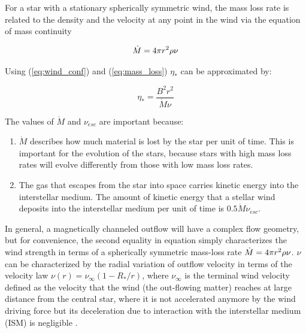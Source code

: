 \documentclass[fleqn,usenatbib]{mnras}
\begin{document}
For a star with a stationary spherically symmetric wind, the mass loss rate is related to the density and the velocity at any point in the wind via the equation of mass continuity

\begin{ceqn}
\begin{equation}
    \Dot{M} = 4\pi r^2\rho\nu \label{eq:mass_loss}
\end{equation}
\end{ceqn}

Using (\ref{eq:wind_conf}) and (\ref{eq:mass_loss}) $\eta_*$ can be approximated by: 
\begin{ceqn}
\begin{equation}
    \eta_* = \frac{B^{2}r^{2}}{\Dot{M}\nu} \label{eq:wind_conf2}
\end{equation}
\end{ceqn}

The values of $\Dot{M}$ and $\nu_{esc}$ are important because:
 \begin{enumerate}
    \item $\Dot{M}$ describes how much material is lost by the star per unit of time. This is important for the evolution of the stars, because stars with high mass loss rates will evolve differently from those with low mass loss rates.
    \item The gas that escapes from the star into space carries kinetic energy into the interstellar medium. The amount of kinetic energy that a stellar wind deposits into the interstellar medium per unit of time is $0.5\Dot{M}\nu_{esc}$.
 \end{enumerate}
 
In general, a magnetically channeled outflow will have a complex flow geometry, but for convenience, the second equality in equation simply characterizes the wind strength in terms of a spherically symmetric mass-loss rate $\Dot{M}=4\pi r^{2}\rho\nu$. $\nu$ can be characterized by the radial variation of outflow velocity in terms of the velocity law $ \nu(r) = \nu_\infty (1-R_*/r)$, where $\nu_\infty$ is the terminal wind velocity defined as the velocity that the wind (the out-flowing matter) reaches at large distance from the central star, where it is not accelerated anymore by the wind driving force but its deceleration due to interaction with the interstellar medium (ISM) is negligible \citep{Niedzielski2002}.\par
\end{document}
